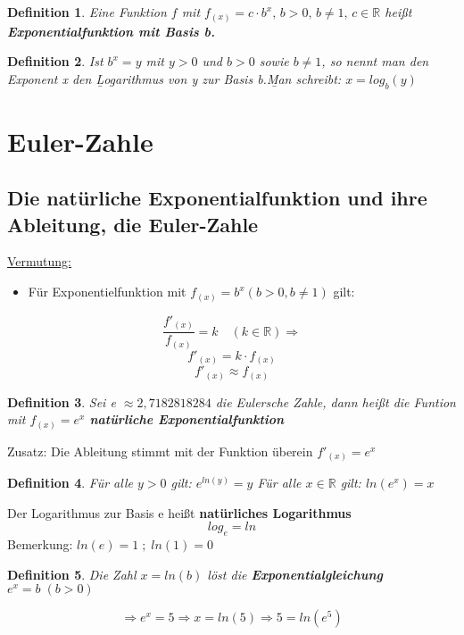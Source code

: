 \documentclass{scrbook}
\newtheorem{definition}{Definition}
\begin{document}
\begin{definition}
Eine Funktion $f$ mit $f_{(x)} = c \cdot b^x,\, b> 0, \,b \neq 1, \,c \in \mathbb{R}$ heißt \textbf{Exponentialfunktion mit Basis b.}
\end{definition}

\begin{definition}
Ist $ b^x = y$ mit $y>0$ und $b>0$ sowie $ b \not = 1$, so nennt man den Exponent x den \b Logarithmus von y zur Basis b.\b
Man schreibt: $x = log_b(y)$
\end{definition}

\section{Euler-Zahle}

\subsection{Die natürliche Exponentialfunktion und ihre Ableitung, die Euler-Zahle}

\underline{Vermutung: }
\begin{itemize}
\item Für Exponentielfunktion mit $f_{(x)} = b^x (b > 0, b \neq 1)$ gilt: 
\end{itemize}
\[\frac{f'_{(x)}}{f_{(x)}} = k \quad (k \in \mathbb{R}) \Rightarrow \]
\[f'_{(x)} = k \cdot f_{(x)}\]
\[f'_{(x)} \approx f_{(x)}\]


\begin{definition}
Sei e $\approx 2, 7182818284$ die Eulersche Zahle, dann heißt die Funtion mit $f_{(x)} = e^x$ \textbf{natürliche Exponentialfunktion}
\end{definition}

Zusatz: Die Ableitung stimmt mit der Funktion überein $f'_{(x)} = e^x$


\begin{definition}
Für alle $ y > 0$ gilt: $e^{ln(y)} = y$
Für alle $ x \in \mathbb{R} $ gilt: $ ln (e^x) = x$
\end{definition}

Der Logarithmus zur Basis e heißt \textbf{ natürliches Logarithmus}
\[log_e = ln\]
Bemerkung: $ ln(e) = 1\; ; \; ln(1) = 0$

\begin{definition}

Die Zahl $ x = ln (b)$ löst die \textbf{Exponentialgleichung $ e^x = b \;(b > 0)$}
\end{definition}
\[ \Rightarrow e^x = 5 \Rightarrow x = ln (5) \Rightarrow 5 = ln (e^5)\]
\end{document}
